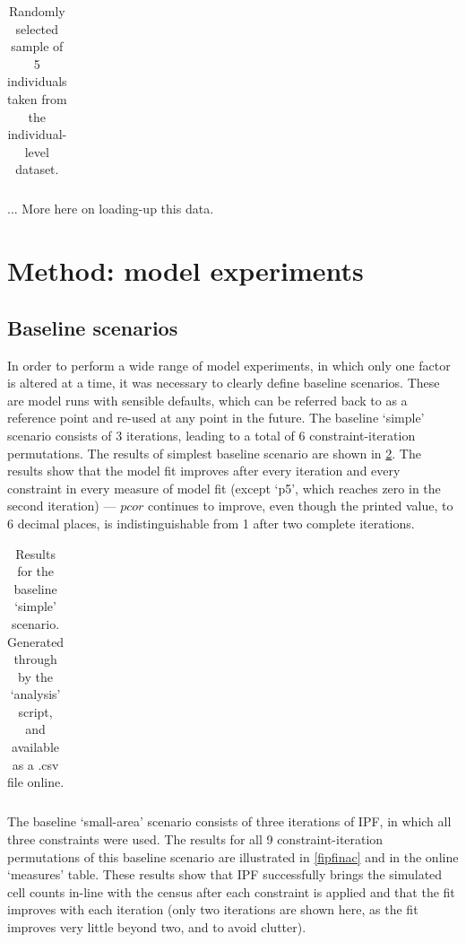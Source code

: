 \documentclass[a4paper,10pt]{article}
\begin{document}
\begin{table}[htbp]
\caption{Randomly selected sample of 5 individuals taken from the individual-level dataset.}
\begin{center}
\begin{tabular}{rrrrr}
\toprule
\bottomrule
\end{tabular}
\end{center}
\label{t4}
\end{table}

... More here on loading-up this data.

\section{Method: model experiments}
\subsection{Baseline scenarios}
In order to perform a wide range of model experiments, 
in which only one factor is altered at a time, it was necessary 
to clearly define baseline scenarios. These are model runs with sensible 
defaults, which can be referred back to as a reference point and re-used at 
any point in the future. The baseline ‘simple’ scenario consists of 3 iterations, 
leading to a total of 6 constraint-iteration permutations. The results of simplest 
baseline scenario are shown in \cref{tblresults1}. The results show that the model 
fit improves after every iteration and every constraint in every measure of model 
fit (except `p5', which reaches zero in the second iteration) --- $pcor$ continues to improve, 
even though the printed value, to 6 decimal places, is indistinguishable from 1 after two complete iterations.

\begin{table}[htbp]
\caption{Results for the baseline `simple' scenario. Generated through by the ‘analysis’ script, and available as a .csv file online.}
\begin{center}
\begin{tabular}{rrrrr}
\toprule
\bottomrule
\end{tabular}
\end{center}
\label{tblresults1}
\end{table}

The baseline `small-area' scenario consists of three
 iterations of IPF, in which all three constraints were 
used. The results for all 9 constraint-iteration permutations 
of this baseline scenario are illustrated in \cref{fipfinac} and %
in the online `measures' table. These results show that IPF successfully 
brings the simulated cell counts in-line with the census after each constraint 
is applied and that the fit improves with each iteration (only two iterations are 
shown here, as the fit improves very little beyond two, and to avoid clutter).
\end{document}
